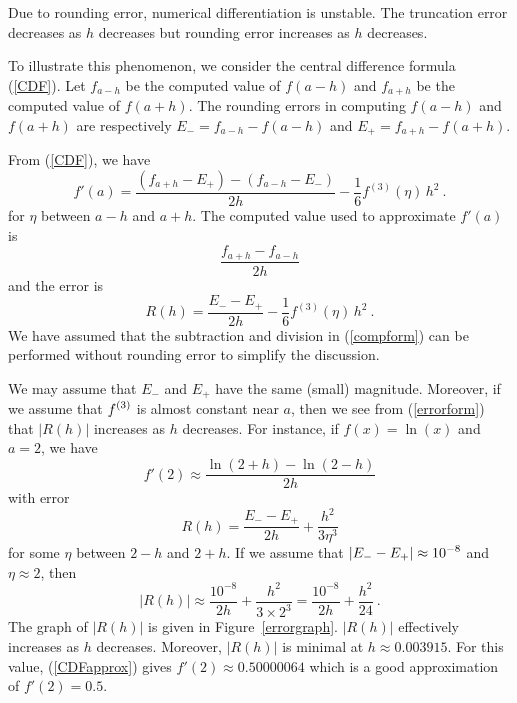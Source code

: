 \begin{rmk}
Due to rounding error, numerical differentiation is unstable.
The truncation error decreases as $h$ decreases but rounding error
increases as $h$ decreases.

To illustrate this phenomenon, we consider the central difference
formula (\ref{CDF}).  Let $f_{a-h}$ be the computed value of
$f(a-h)$ and $f_{a+h}$ be the computed value of $f(a+h)$.
The rounding errors in computing $f(a-h)$ and $f(a+h)$ are 
respectively $E_- = f_{a-h} - f(a-h)$ and $E_+ = f_{a+h} - f(a+h)$.

From (\ref{CDF}), we have
\[
f'(a) = \frac{( f_{a+h}-E_+ ) - ( f_{a-h} -E_- )}{2h}
- \frac{1}{6}f^{(3)}(\eta)\,h^2 \ .
\]
for $\eta$ between $a-h$ and $a+h$.  The computed value used to
approximate $f'(a)$ is
\begin{equation}\label{compform}
\frac{f_{a+h}- f_{a-h}}{2h}
\end{equation}
and the error is
\begin{equation} \label{errorform}
R(h) =  \frac{E_- - E_+ }{2h} - \frac{1}{6}f^{(3)}(\eta)\,h^2 \ .
\end{equation}
We have assumed that the subtraction and division in (\ref{compform})
can be performed without rounding error to simplify the discussion.

We may assume that $E_-$ and $E_+$ have the same (small) magnitude.
Moreover, if we assume that $\displaystyle f^{(3)}$ is almost constant near $a$,
then we see from (\ref{errorform}) that $|R(h)|$ increases as $h$
decreases.  For instance, if $f(x) = \ln(x)$ and $a=2$, we have
\begin{equation} \label{CDFapprox}
f'(2) \approx \frac{\ln(2+h) - \ln(2-h)}{2h}
\end{equation}
with error
\[
R(h) =  \frac{E_- - E_+ }{2h} + \frac{h^2}{3\eta^3}
\]
for some $\eta$ between $2-h$ and $2+h$.  If we assume that
$\displaystyle |E_- - E_+| \approx 10^{-8}$ and $\eta \approx 2$, then
\[
|R(h)| \approx \frac{10^{-8}}{2h} + \frac{h^2}{3\times 2^3}
= \frac{10^{-8}}{2h} + \frac{h^2}{24} \ .
\]
The graph of $|R(h)|$ is given in Figure~\ref{errorgraph}.  $|R(h)|$
effectively increases as $h$ decreases.  Moreover, $|R(h)|$ is minimal
at $h\approx 0.003915$.  For this value, (\ref{CDFapprox}) gives
$f'(2) \approx 0.50000064$ which is a good approximation of $f'(2) = 0.5$.
\end{rmk}


